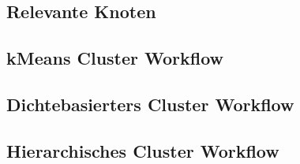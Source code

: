 \documentclass[12pt,					%
							 oneside,			%
							 a4paper,			%
							 halfparskip,		%
							 liststotoc,			%
							 bibtotoc,			%
							 fleqn,				%
							 pointlessnumbers]	%
							 {scrreprt}
\begin{document}
		\subsection{Relevante Knoten}
		\subsection{kMeans Cluster Workflow}
		\subsection{Dichtebasierters Cluster Workflow}
		\subsection{Hierarchisches Cluster Workflow}

	
	
	\nocite{*}						%
	

	\listoffigures						%

	\appendix
	
\end{document}
